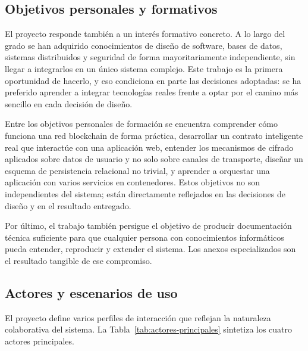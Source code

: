\documentclass[11pt, a4paper]{article}
\begin{document}
\subsection{Objetivos personales y formativos}

El proyecto responde también a un interés formativo concreto. A lo largo del grado se han adquirido conocimientos de diseño de software, bases de datos, sistemas distribuidos y seguridad de forma mayoritariamente independiente, sin llegar a integrarlos en un único sistema complejo. Este trabajo es la primera oportunidad de hacerlo, y eso condiciona en parte las decisiones adoptadas: se ha preferido aprender a integrar tecnologías reales frente a optar por el camino más sencillo en cada decisión de diseño.

Entre los objetivos personales de formación se encuentra comprender cómo funciona una red blockchain de forma práctica, desarrollar un contrato inteligente real que interactúe con una aplicación web, entender los mecanismos de cifrado aplicados sobre datos de usuario y no solo sobre canales de transporte, diseñar un esquema de persistencia relacional no trivial, y aprender a orquestar una aplicación con varios servicios en contenedores. Estos objetivos no son independientes del sistema; están directamente reflejados en las decisiones de diseño y en el resultado entregado.

Por último, el trabajo también persigue el objetivo de producir documentación técnica suficiente para que cualquier persona con conocimientos informáticos pueda entender, reproducir y extender el sistema. Los anexos especializados son el resultado tangible de ese compromiso.

\subsection{Actores y escenarios de uso}

El proyecto define varios perfiles de interacción que reflejan la naturaleza colaborativa del sistema. La Tabla~\ref{tab:actores-principales} sintetiza los cuatro actores principales.
\end{document}
